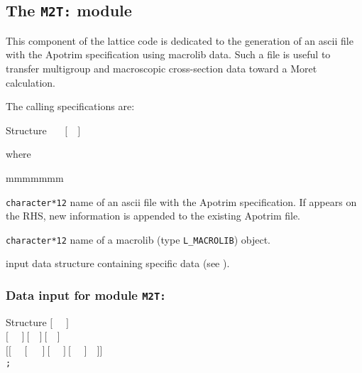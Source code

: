 \subsection{The {\tt M2T:} module}\label{sect:M2TData}

This component of the lattice code is dedicated to the generation of an {\sc ascii} file
with the Apotrim specification using {\sc macrolib} data. Such a file is useful to transfer multigroup
and macroscopic cross-section data toward a Moret calculation.

\vskip 0.02cm

The calling specifications are:

\begin{DataStructure}{Structure }
~\moc{:=}~~$[$~~$]$~~\moc{::}~ \\
\end{DataStructure}

\noindent where
\begin{ListeDeDescription}{mmmmmmm}

\item[\dusa{APTRIM}] {\tt character*12} name of an {\sc ascii} file with the Apotrim specification. If  appears on the RHS, new information is appended to the existing Apotrim file.

\item[\dusa{MLIB}] {\tt character*12} name of a {\sc macrolib} (type {\tt L\_MACROLIB}) object.

\item[\dusa{M2T\_data}] input data structure containing specific data (see ).

\end{ListeDeDescription}

\subsubsection{Data input for module {\tt M2T:}}\label{sect:descM2T}

\vskip -0.5cm

\begin{DataStructure}{Structure }
$[$~ ~$]$ \\
$[$~ ~$]~[$~~$]~[$~~$]$ \\
$[[$~ ~$[$~~~$]~[$~ ~$]~[$~ ~$]$~~$]]$\\
{\tt ;}
\end{DataStructure}

